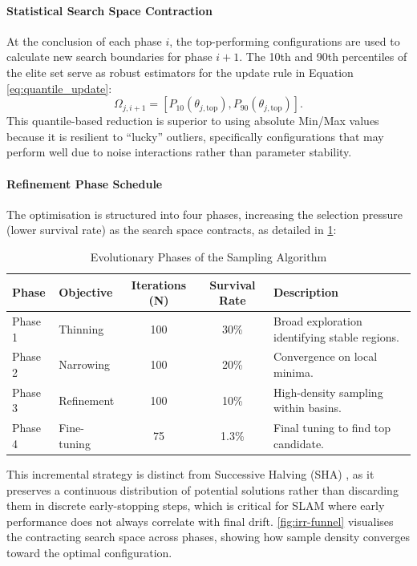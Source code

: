 \paragraph{Statistical Search Space Contraction}
At the conclusion of each phase $i$, the top-performing configurations are used to calculate new search boundaries for phase $i+1$. The 10th and 90th percentiles of the elite set serve as robust estimators for the update rule in Equation \eqref{eq:quantile_update}:
\begin{equation}
\label{eq:quantile_update}
\Omega_{j, i+1} = [P_{10}(\theta_{j, \text{top}}), P_{90}(\theta_{j, \text{top}})].
\end{equation}
This quantile-based reduction is superior to using absolute Min/Max values because it is resilient to ``lucky'' outliers, specifically configurations that may perform well due to noise interactions rather than parameter stability.

\paragraph{Refinement Phase Schedule}
The optimisation is structured into four phases, increasing the selection pressure (lower survival rate) as the search space contracts, as detailed in \cref{tab:phases}:

\begin{table}[h]
\centering
\caption{Evolutionary Phases of the Sampling Algorithm}
\label{tab:phases}
\begin{tabularx}{\textwidth}{@{} l l c c X @{}}
\toprule
\textbf{Phase} & \textbf{Objective} & \textbf{Iterations (N)} & \textbf{Survival Rate} & \textbf{Description} \\ \midrule
Phase 1 & Thinning & 100 & 30\% & Broad exploration identifying stable regions. \\
Phase 2 & Narrowing & 100 & 20\% & Convergence on local minima. \\
Phase 3 & Refinement & 100 & 10\% & High-density sampling within basins. \\
Phase 4 & Fine-tuning & 75 & 1.3\% & Final tuning to find top candidate. \\ \bottomrule
\end{tabularx}
\end{table}

This incremental strategy is distinct from Successive Halving (SHA) \cite{jamiesonNonstochasticBestArm2015}, as it preserves a continuous distribution of potential solutions rather than discarding them in discrete early-stopping steps, which is critical for SLAM where early performance does not always correlate with final drift. \cref{fig:irr-funnel} visualises the contracting search space across phases, showing how sample density converges toward the optimal configuration.

